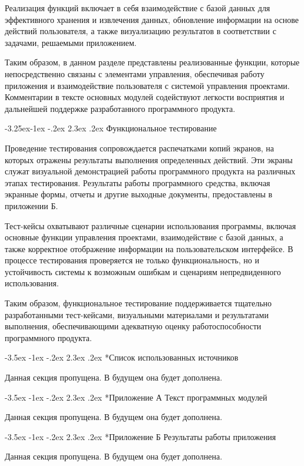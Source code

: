 \documentclass[a4paper,draft]{report}
\makeatletter
\renewcommand\section{\@startsection {section}{1}{\z@}%
  {-3.5ex \@plus -1ex \@minus -.2ex}%
  {2.3ex \@plus.2ex}%
  {\normalfont\newpage\indent\bfseries}}
\renewcommand\subsection{\@startsection{subsection}{2}{\z@}%
  {-3.25ex\@plus -1ex \@minus -.2ex}%
  {2.3ex \@plus .2ex}%
  {\normalfont\indent\bfseries}}
\makeatother
\begin{document}
Реализация функций включает в себя взаимодействие с базой данных для эффективного хранения и извлечения данных, обновление информации на основе действий пользователя, а также визуализацию результатов в соответствии с задачами, решаемыми приложением.

Таким образом, в данном разделе представлены реализованные функции, которые непосредственно связаны с элементами управления, обеспечивая работу приложения и взаимодействие пользователя с системой управления проектами.
Комментарии в тексте основных модулей содействуют легкости восприятия и дальнейшей поддержке разработанного программного продукта.

\subsection{Функциональное тестирование}

Проведение тестирования сопровождается распечатками копий экранов, на которых отражены результаты выполнения определенных действий.
Эти экраны служат визуальной демонстрацией работы программного продукта на различных этапах тестирования.
Результаты работы программного средства, включая экранные формы, отчеты и другие выходные документы, предоставлены в приложении Б.

Тест-кейсы охватывают различные сценарии использования программы, включая основные функции управления проектами, взаимодействие с базой данных, а также корректное отображение информации на пользовательском интерфейсе.
В процессе тестирования проверяется не только функциональность, но и устойчивость системы к возможным ошибкам и сценариям непредвиденного использования.

Таким образом, функциональное тестирование поддерживается тщательно разработанными тест-кейсами, визуальными материалами и результатами выполнения, обеспечивающими адекватную оценку работоспособности программного продукта.

\section*{Список использованных источников}

Данная секция пропущена.
В будущем она будет дополнена.

\section*{Приложение А Текст программных модулей}

Данная секция пропущена.
В будущем она будет дополнена.

\section*{Приложение Б Результаты работы приложения}

Данная секция пропущена.
В будущем она будет дополнена.
\end{document}
